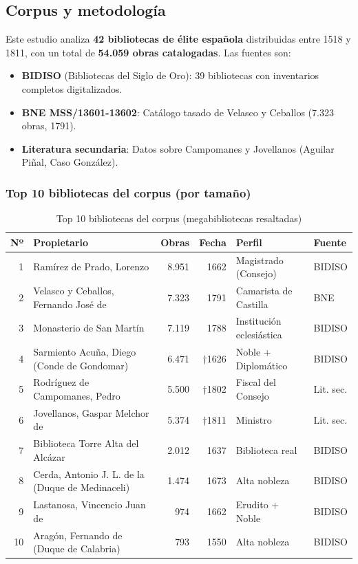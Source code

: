 \documentclass[12pt,a4paper]{article}
\begin{document}
\subsection{Corpus y metodología}

Este estudio analiza \textbf{42 bibliotecas de élite española} distribuidas entre 1518 y 1811, con un total de \textbf{54.059 obras catalogadas}. Las fuentes son:

\begin{itemize}
\item \textbf{BIDISO} (Bibliotecas del Siglo de Oro): 39 bibliotecas con inventarios completos digitalizados.
\item \textbf{BNE MSS/13601-13602}: Catálogo tasado de Velasco y Ceballos (7.323 obras, 1791).
\item \textbf{Literatura secundaria}: Datos sobre Campomanes y Jovellanos (Aguilar Piñal, Caso González).
\end{itemize}

\subsubsection{Top 10 bibliotecas del corpus (por tamaño)}

\begin{table}[h]
\centering
\begin{tabular}{rlrrll}
\toprule
\textbf{Nº} & \textbf{Propietario} & \textbf{Obras} & \textbf{Fecha} & \textbf{Perfil} & \textbf{Fuente} \\
\midrule
\rowcolor{yellow!30}
1 & Ramírez de Prado, Lorenzo & 8.951 & 1662 & Magistrado (Consejo) & BIDISO \\
\rowcolor{yellow!30}
2 & Velasco y Ceballos, Fernando José de & 7.323 & 1791 & Camarista de Castilla & BNE \\
\rowcolor{yellow!30}
3 & Monasterio de San Martín & 7.119 & 1788 & Institución eclesiástica & BIDISO \\
\rowcolor{yellow!30}
4 & Sarmiento Acuña, Diego (Conde de Gondomar) & 6.471 & †1626 & Noble + Diplomático & BIDISO \\
\rowcolor{yellow!30}
5 & Rodríguez de Campomanes, Pedro & 5.500 & †1802 & Fiscal del Consejo & Lit. sec. \\
\rowcolor{yellow!30}
6 & Jovellanos, Gaspar Melchor de & 5.374 & †1811 & Ministro & Lit. sec. \\
7 & Biblioteca Torre Alta del Alcázar & 2.012 & 1637 & Biblioteca real & BIDISO \\
8 & Cerda, Antonio J. L. de la (Duque de Medinaceli) & 1.474 & 1673 & Alta nobleza & BIDISO \\
9 & Lastanosa, Vincencio Juan de & 974 & 1662 & Erudito + Noble & BIDISO \\
10 & Aragón, Fernando de (Duque de Calabria) & 793 & 1550 & Alta nobleza & BIDISO \\
\bottomrule
\end{tabular}
\caption{Top 10 bibliotecas del corpus (megabibliotecas resaltadas)}
\end{table}
\end{document}
